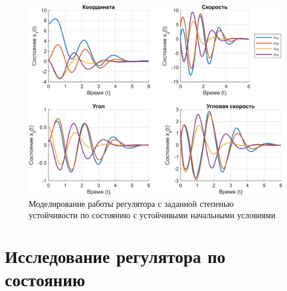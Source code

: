 \begin{figure}[H]
    \centering
    \includegraphics[width=\linewidth]{figs/4.1.sim.png}
    \caption{Моделирование работы регулятора с заданной степенью устойчивости 
    по состоянию с устойчивыми начальными условиями}
    \label{fig:4.1.sim}
\end{figure}

\section{Исследование регулятора по состоянию}

